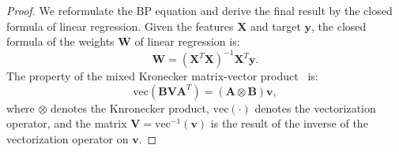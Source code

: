 \begin{proof}

We reformulate the BP equation and derive the final result by the closed formula of linear regression.
Given the features ${\boldsymbol X}$ and target ${\boldsymbol y}$, the closed formula of the weights ${\boldsymbol W}$ of linear regression is:
\begin{equation} \label{eqn:reg}
    {\boldsymbol W} = ({\boldsymbol X}^{T}{\boldsymbol X})^{-1}{\boldsymbol X}^{T}{\boldsymbol y}.
\end{equation}
The property of the mixed Kronecker matrix-vector product~\cite{bernstein2009matrix} is:
\begin{equation} \label{eqn:mvp}
    \text{vec}{({\boldsymbol B}{\boldsymbol V}{\boldsymbol A}^{T})} = ({\boldsymbol A} \otimes {\boldsymbol B}){\boldsymbol v},
\end{equation}
where $\otimes$ denotes the Knronecker product, $\text{vec}(\cdot)$ denotes the vectorization operator, and the matrix ${\boldsymbol V} = \text{vec}^{-1}({\boldsymbol v})$ is the result of the inverse of the vectorization operator on ${\boldsymbol v}$.


\end{proof}
